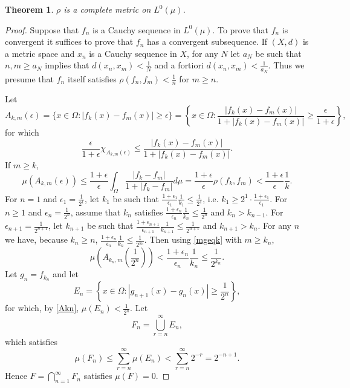 \documentclass{article}
\newtheorem{theorem}{Theorem}
\theoremstyle{definition}
\begin{document}
\begin{theorem}
$\rho$ is a complete metric on $L^0(\mu)$.
\end{theorem}
\begin{proof}
Suppose that $f_n$ is a Cauchy
sequence in $L^0(\mu)$. 
To prove that $f_n$ is convergent it suffices to prove that
$f_n$ has a convergent subsequence. 
If $(X,d)$ is a metric space and $x_n$ is a Cauchy sequence in $X$, for any $N$ let 
$a_N$ be such that $n,m \geq a_N$ implies that $d(x_n,x_m)<\frac{1}{N}$ and a fortiori
$d(x_n,x_m)<\frac{1}{a_N}$. 
Thus we presume that $f_n$ itself satisfies $\rho(f_n,f_m)<\frac{1}{n}$ for $m \geq n$. 

Let
\[
A_{k,m}(\epsilon) = \{x \in \Omega: |f_k(x)-f_m(x)| \geq \epsilon\}
=\left\{ x\in \Omega:
\frac{|f_k(x)-f_m(x)|}{1+|f_k(x)-f_m(x)|} \geq \frac{\epsilon}{1+\epsilon}\right\},
\]
for which
\[
\frac{\epsilon}{1+\epsilon} \chi_{A_{k,m}(\epsilon)} \leq 
\frac{|f_k(x)-f_m(x)|}{1+|f_k(x)-f_m(x)|}.
\]
If $m \geq k$,
\begin{equation}
\mu(A_{k,m}(\epsilon)) 
\leq \frac{1+\epsilon}{\epsilon} \int_{\Omega}
\frac{|f_k-f_m|}{1+|f_k-f_m|} d\mu
=\frac{1+\epsilon}{\epsilon} \rho(f_k,f_m)
<\frac{1+\epsilon}{\epsilon} \frac{1}{k}.
\label{mgeqk}
\end{equation}
For $n=1$ and $\epsilon_1=\frac{1}{2^1}$, let $k_1$ be such that $\frac{1+\epsilon_1}{\epsilon_1} \frac{1}{k_1} \leq \frac{1}{2^1}$, i.e.
$k_1 \geq 2^1 \cdot \frac{1+\epsilon_1}{\epsilon_1}$. For $n \geq 1$ and $\epsilon_n=\frac{1}{2^n}$, assume that
$k_n$ satisfies $\frac{1+\epsilon_n}{\epsilon_n} \frac{1}{k_n} \leq \frac{1}{2^n}$ and $k_n>k_{n-1}$. 
For $\epsilon_{n+1}=\frac{1}{2^{n+1}}$, let $k_{n+1}$ be such that $\frac{1+\epsilon_{n+1}}{\epsilon_{n+1}} \frac{1}{k_{n+1}} \leq \frac{1}{2^{n+1}}$
and $k_{n+1}>k_n$. For any $n$ we have, because $k_n \geq n$,
$\frac{1+\epsilon_n}{\epsilon_n} \frac{1}{k_n} \leq  \frac{1}{2^{k_n}}$. Then using \eqref{mgeqk} with $m \geq k_n$,
\begin{equation}
\mu\left(A_{k_n,m}\left(\frac{1}{2^n}\right)\right) < \frac{1+\epsilon_n}{\epsilon_n} \frac{1}{k_n} \leq \frac{1}{2^{k_n}}. 
\label{Akn}
\end{equation}
Let $g_n=f_{k_n}$ and let
\[
E_n= \left\{ x \in \Omega: |g_{n+1}(x)-g_n(x)| \geq \frac{1}{2^n} \right\},
\]
for which, by \eqref{Akn}, $\mu(E_n)<\frac{1}{2^n}$. Let
\[
F_n=\bigcup_{r=n}^\infty E_n,
\]
which satisfies
\[
\mu(F_n) \leq \sum_{r=n}^\infty \mu(E_n) < \sum_{r=n}^\infty 2^{-r} = 2^{-n+1}.
\]
Hence $F=\bigcap_{n=1}^\infty F_n$ satisfies $\mu(F)=0$. 


\end{proof}
\end{document}
